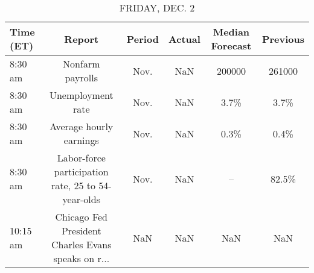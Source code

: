 \documentclass{article}%
\begin{document}
%


\begin{table}[htbp]%
\caption{FRIDAY, DEC. 2}%
\centering%
\begin{adjustbox}{width=1\textwidth}%
\begin{tabular}{lccccc}
\toprule
Time (ET) &                                             Report & Period & Actual & Median Forecast & Previous \\
\midrule
  8:30 am &                                   Nonfarm payrolls &   Nov. &    NaN &          200000 &   261000 \\
  8:30 am &                                  Unemployment rate &   Nov. &    NaN &            3.7\% &     3.7\% \\
  8:30 am &                            Average hourly earnings &   Nov. &    NaN &            0.3\% &     0.4\% \\
  8:30 am & Labor-force participation rate, 25 to 54-year-olds &   Nov. &    NaN &              -- &    82.5\% \\
 10:15 am & Chicago Fed President Charles Evans speaks on r... &    NaN &    NaN &             NaN &      NaN \\
\bottomrule
\end{tabular}
%
\end{adjustbox}%
\end{table}
\end{document}
